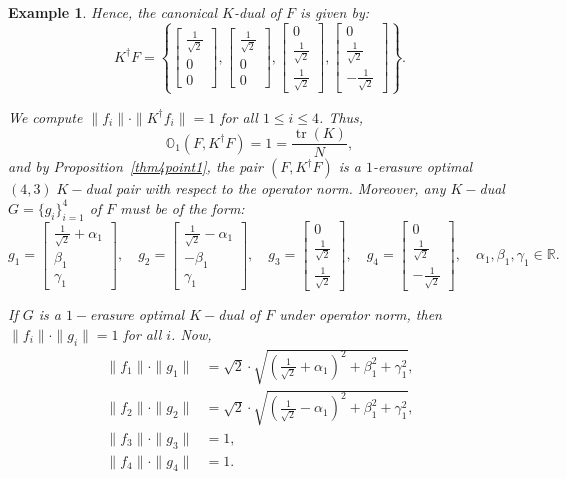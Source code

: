 \documentclass[final,1p,times]{elsarticle}
\newtheorem{example}[thm]{Example}
\begin{document}
\begin{example}
Hence, the canonical $K$-dual of $F$ is given by:
\[
K^\dag F = \left\{
\begin{bmatrix} \frac{1}{\sqrt{2}} \\ 0 \\ 0 \end{bmatrix},
\begin{bmatrix} \frac{1}{\sqrt{2}} \\ 0 \\ 0 \end{bmatrix},
\begin{bmatrix} 0 \\ \frac{1}{\sqrt{2}} \\ \frac{1}{\sqrt{2}} \end{bmatrix},
\begin{bmatrix} 0 \\ \frac{1}{\sqrt{2}} \\ -\frac{1}{\sqrt{2}} \end{bmatrix}
\right\}.
\]

We compute $\|f_i\| \cdot \|K^\dag f_i\| = 1$ for all $1 \leq i \leq 4$. Thus,
\[
\mathbb{O}_{1}(F, K^\dag F) = 1 = \frac{\operatorname{tr}(K)}{N},
\]
and by Proposition~\ref{thm4point1}, the pair $(F, K^\dag F)$ is a $1$-erasure optimal $(4,3)\;K-$dual pair with respect to the operator norm. Moreover, any $K-$dual $G = \{g_i\}_{i=1}^4$ of $F$ must be of the form:
\[
g_1 = \begin{bmatrix} \frac{1}{\sqrt{2}} + \alpha_1 \\ \beta_1 \\ \gamma_1 \end{bmatrix}, \quad
g_2 = \begin{bmatrix} \frac{1}{\sqrt{2}} - \alpha_1 \\ -\beta_1 \\ \gamma_1 \end{bmatrix}, \quad
g_3 = \begin{bmatrix} 0 \\ \frac{1}{\sqrt{2}} \\ \frac{1}{\sqrt{2}} \end{bmatrix}, \quad
g_4 = \begin{bmatrix} 0 \\ \frac{1}{\sqrt{2}} \\ -\frac{1}{\sqrt{2}} \end{bmatrix}, \quad
\alpha_1, \beta_1, \gamma_1 \in \mathbb{R}.
\]

If $G$ is a $1-$erasure optimal $K-$dual of $F$ under operator norm, then $\|f_i\| \cdot \|g_i\| = 1$ for all $i$. Now,
\begin{align*}
\|f_1\| \cdot \|g_1\| &= \sqrt{2} \cdot \sqrt{\left( \frac{1}{\sqrt{2}} + \alpha_1 \right)^2 + \beta_1^2 + \gamma_1^2}, \\
\|f_2\| \cdot \|g_2\| &= \sqrt{2} \cdot \sqrt{\left( \frac{1}{\sqrt{2}} - \alpha_1 \right)^2 + \beta_1^2 + \gamma_1^2}, \\
\|f_3\| \cdot \|g_3\| &= 1, \\
\|f_4\| \cdot \|g_4\| &= 1.
\end{align*}


\end{example}
\end{document}
